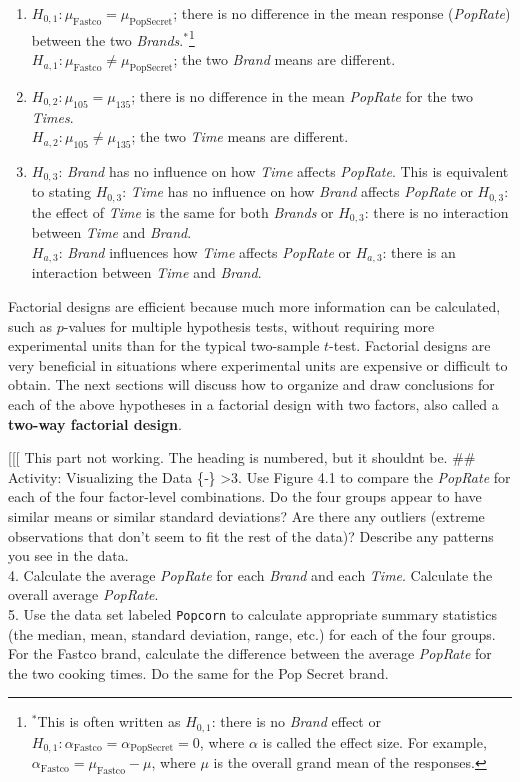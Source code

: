 \documentclass[
]{report}
\begin{document}
\begin{enumerate}
\def\labelenumi{\arabic{enumi}.}
\item
  \(H_{0,1}: \mu_{\text{Fastco}} = \mu_{\text{PopSecret}}\); there is no difference in the mean response (\emph{PopRate}) between the two \emph{Brands}.\(^*\)\footnote{\(^*\)This is often written as \(H_{0,1}\): there is no \emph{Brand} effect or \(H_{0,1}: \alpha_{\text{Fastco}} = \alpha_{\text{PopSecret}} = 0\), where \(\alpha\) is called the effect size. For example, \(\alpha_{\text{Fastco}} = \mu_{\text{Fastco}} - \mu\), where \(\mu\) is the overall grand mean of the responses.}\\
  \(H_{a,1}: \mu_{\text{Fastco}} \ne \mu_{\text{PopSecret}}\); the two \emph{Brand} means are different.
\item
  \(H_{0,2}: \mu_{105} = \mu_{135}\); there is no difference in the mean \emph{PopRate} for the two \emph{Times}.\\
  \(H_{a,2}: \mu_{105} \ne \mu_{135}\); the two \emph{Time} means are different.
\item
  \(H_{0,3}\): \emph{Brand} has no influence on how \emph{Time} affects \emph{PopRate}. This is equivalent to stating \(H_{0,3}\): \emph{Time} has no influence on how \emph{Brand} affects \emph{PopRate} or \(H_{0,3}\): the effect of \emph{Time} is the same for both \emph{Brands} or \(H_{0,3}\): there is no interaction between \emph{Time} and \emph{Brand}.\\
  \(H_{a,3}\): \emph{Brand} influences how \emph{Time} affects \emph{PopRate} or \(H_{a,3}\): there is an interaction between \emph{Time} and \emph{Brand}.
\end{enumerate}

Factorial designs are efficient because much more information can be calculated, such as \(p\)-values for multiple hypothesis tests, without requiring more experimental units than for the typical two-sample \(t\)-test. Factorial designs are very beneficial in situations where experimental units are expensive or difficult to obtain. The next sections will discuss how to organize and draw conclusions for each of the above hypotheses in a factorial design with two factors, also called a \textbf{two-way factorial design}.

{[}{[}{[} This part not working. The heading is numbered, but it shouldnt be.
\#\# Activity: Visualizing the Data \{‑\}
\textgreater3. Use Figure 4.1 to compare the \textit{PopRate} for each of the four factor-level combinations. Do the four groups appear to have similar means or similar standard deviations? Are there any outliers (extreme observations that don't seem to fit the rest of the data)? Describe any patterns you see in the data.\\
4. Calculate the average \emph{PopRate} for each \emph{Brand} and each \emph{Time}. Calculate the overall average \emph{PopRate}.\\
5. Use the data set labeled \texttt{Popcorn} to calculate appropriate summary statistics (the median, mean, standard deviation, range, etc.) for each of the four groups. For the Fastco brand, calculate the difference between the average \emph{PopRate} for the two cooking times. Do the same for the Pop Secret brand.
\end{document}
